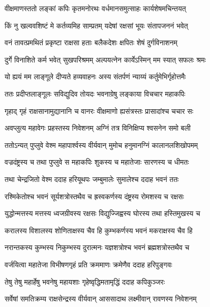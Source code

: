 
\twolineshloka
{वीक्षमाणस्ततो लङ्कां कपिः कृतमनोरथः}
{वर्धमानसमुत्साहः कार्यशेषमचिन्तयत्} %

\twolineshloka
{किं नु खल्ववशिष्टं मे कर्तव्यमिह साम्प्रतम्}
{यदेषां रक्षसां भूयः संतापजननं भवेत्} %

\twolineshloka
{वनं तावत्प्रमथितं प्रकृष्टा राक्षसा हताः}
{बलैकदेशः क्षपितः शेषं दुर्गविनाशनम्} %

\twolineshloka
{दुर्गे विनाशिते कर्म भवेत् सुखपरिश्रमम्}
{अल्पयत्नेन कार्येऽस्मिन् मम स्यात् सफलः श्रमः} %

\twolineshloka
{यो ह्ययं मम लाङ्गूले दीप्यते हव्यवाहनः}
{अस्य संतर्पणं न्याय्यं कर्तुमेभिर्गृहोत्तमैः} %

\twolineshloka
{ततः प्रदीप्तलाङ्गूलः सविद्युदिव तोयदः}
{भवनाग्रेषु लङ्काया विचचार महाकपिः} %

\twolineshloka
{गृहाद् गृहं राक्षसानामुद्यानानि च वानरः}
{वीक्षमाणो ह्यसंत्रस्तः प्रासादांश्च चचार सः} %

\twolineshloka
{अवप्लुत्य महावेगः प्रहस्तस्य निवेशनम्}
{अग्निं तत्र विनिक्षिप्य श्वसनेन समो बली} %

\twolineshloka
{ततोऽन्यत् पुप्लुवे वेश्म महापार्श्वस्य वीर्यवान्}
{मुमोच हनुमानग्निं कालानलशिखोपमम्} %

\twolineshloka
{वज्रदंष्ट्रस्य च तथा पुप्लुवे स महाकपिः}
{शुकस्य च महातेजाः सारणस्य च धीमतः} %

\twolineshloka
{तथा चेन्द्रजितो वेश्म ददाह हरियूथपः}
{जम्बुमालेः सुमालेश्च ददाह भवनं ततः} %

\twolineshloka
{रश्मिकेतोश्च भवनं सूर्यशत्रोस्तथैव च}
{ह्रस्वकर्णस्य दंष्ट्रस्य रोमशस्य च रक्षसः} %

\twolineshloka
{युद्धोन्मत्तस्य मत्तस्य ध्वजग्रीवस्य रक्षसः}
{विद्युज्जिह्वस्य घोरस्य तथा हस्तिमुखस्य च} %

\twolineshloka
{करालस्य विशालस्य शोणिताक्षस्य चैव हि}
{कुम्भकर्णस्य भवनं मकराक्षस्य चैव हि} %

\twolineshloka
{नरान्तकस्य कुम्भस्य निकुम्भस्य दुरात्मनः}
{यज्ञशत्रोश्च भवनं ब्रह्मशत्रोस्तथैव च} %

\twolineshloka
{वर्जयित्वा महातेजा विभीषणगृहं प्रति}
{क्रममाणः क्रमेणैव ददाह हरिपुङ्गवः} %

\twolineshloka
{तेषु तेषु महार्हेषु भवनेषु महायशाः}
{गृहेष्वृद्धिमतामृद्धिं ददाह कपिकुञ्जरः} %

\twolineshloka
{सर्वेषां समतिक्रम्य राक्षसेन्द्रस्य वीर्यवान्}
{आससादाथ लक्ष्मीवान् रावणस्य निवेशनम्} %

